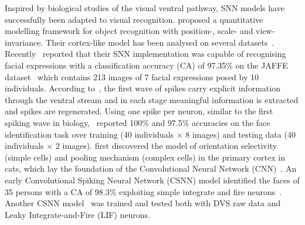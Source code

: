 Inspired by biological studies of the visual ventral pathway, SNN models have successfully been adapted to visual recognition. \cite{riesenhuber1999hierarchical} proposed a quantitative modelling framework for object recognition with position-, scale- and view-invariance.
Their cortex-like model has been analysed on several datasets~\cite{serre2007robust}.
Recently~\cite{fu2012spiking} reported that their SNN implementation was capable of recognising facial expressions with a classification accuracy (CA) of 97.35\% on the JAFFE dataset~\cite{lyons1998coding} which contains 213 images of 7 facial expressions posed by 10 individuals.
According to~\cite{vanrullen2002surfing}, the first wave of spikes carry explicit information through the ventral stream and in each stage meaningful information is extracted and spikes are regenerated. 
Using one spike per neuron, similar to the first spiking wave in biology,~\cite{delorme2001face} reported 100\% and 97.5\% accuracies on the face identification task over
training (40 individuals $\times$ 8 images) and testing data (40 individuals $\times$ 2 images).
\cite{hubel1962receptive} first discovered the model of orientation selectivity (simple cells) and pooling mechanism (complex cells) in the primary cortex in cats, which lay the foundation of the Convolutional Neural Network (CNN)~\cite{lecun1998gradient}.
An early Convolutional Spiking Neural Network (CSNN) model identified the faces of 35 persons with a CA of 98.3\% exploiting simple integrate and fire neurons~\cite{matsugu2002convolutional}.
Another CSNN model~\cite{zhao2014feedforward} was trained and tested both with DVS raw data and Leaky Integrate-and-Fire (LIF) neurons.
